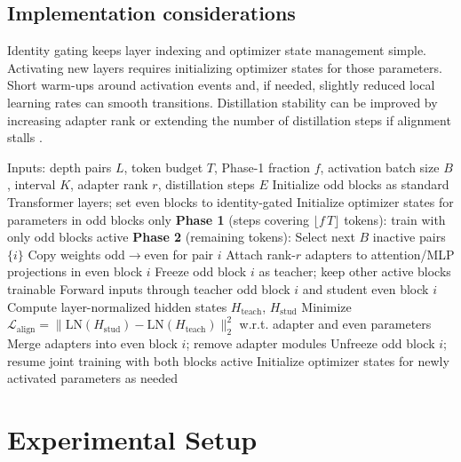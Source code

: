 \documentclass{article}
\begin{document}
\subsection{Implementation considerations}
Identity gating keeps layer indexing and optimizer state management simple. Activating new layers requires initializing optimizer states for those parameters. Short warm-ups around activation events and, if needed, slightly reduced local learning rates can smooth transitions. Distillation stability can be improved by increasing adapter rank or extending the number of distillation steps if alignment stalls \cite{miles-2024-velora}.

\begin{algorithm}
\caption{PLAD-T two-phase training with progressive activation and local self-distillation}
\begin{algorithmic}
  \State Inputs: depth pairs \(L\), token budget \(T\), Phase-1 fraction \(f\), activation batch size \(B\), interval \(K\), adapter rank \(r\), distillation steps \(E\)
  \State Initialize odd blocks as standard Transformer layers; set even blocks to identity-gated
  \State Initialize optimizer states for parameters in odd blocks only
  \State \textbf{Phase 1} (steps covering \(\lfloor f\,T\rfloor\) tokens): train with only odd blocks active
  \State \textbf{Phase 2} (remaining tokens):
    \State Select next \(B\) inactive pairs \(\{i\}\)
      \State Copy weights odd\(\to\)even for pair \(i\)
      \State Attach rank-\(r\) adapters to attention/MLP projections in even block \(i\)
      \State Freeze odd block \(i\) as teacher; keep other active blocks trainable
        \State Forward inputs through teacher odd block \(i\) and student even block \(i\)
        \State Compute layer-normalized hidden states \(H_{\text{teach}}\), \(H_{\text{stud}}\)
        \State Minimize \(\mathcal{L}_{\text{align}} = \lVert \text{LN}(H_{\text{stud}}) - \text{LN}(H_{\text{teach}}) \rVert_2^2\) w.r.t. adapter and even parameters
      \EndFor
      \State Merge adapters into even block \(i\); remove adapter modules
      \State Unfreeze odd block \(i\); resume joint training with both blocks active
      \State Initialize optimizer states for newly activated parameters as needed
    \EndFor
  \EndFor
\end{algorithmic}
\end{algorithm}

\section{Experimental Setup}
\end{document}
